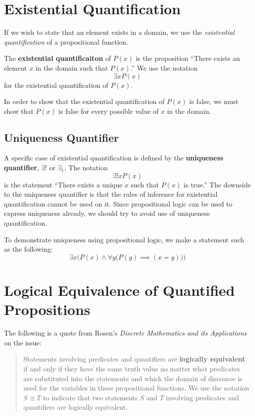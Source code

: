\section{Existential Quantification}

If we wish to state that an element exists in a domain, we use the \emph{existential quantification} of a propositional function.

The \textbf{existential quantificaiton} of $P(x)$ is the proposition
  ``There exists an element $x$ in the domain such that $P(x)$.''
We use the notation \[\exists x P(x)\] for the existential quantification of $P(x)$.

\begin{note}
  In order to show that the existential quantification of $P(x)$ is false, we must
  show that $P(x)$ is false for every possible value of $x$ in the domain.
\end{note}


\subsection{Uniqueness Quantifier}
A specific case of existential quantification is defined by the
\textbf{uniqueness quantifier}, $\exists!$ or $\exists_1$. The notation
\[ \exists! x P(x) \]
is the statement ``There exists a unique $x$ such that $P(x)$ is true.'' The
downside to the uniqueness quantifier is that the rules of inference for
existential quantification cannot be used on it. Since propositional logic can
be used to express uniqueness already, we should try to avoid use of uniqueness
quantification.

To demonstrate uniqueness using propositional logic, we make a statement such as the following:
\[ \exists x \Big( P(x) \land \forall y \big( P(y) \implies (x=y)\big)\Big) \]

\section{Logical Equivalence of Quantified Propositions}

The following is a quote from Rosen's \emph{Discrete Mathematics and its Applications} on the issue:

\begin{quote}
  Statements involving predicates and quantifiers are \textbf{logically
  equivalent} if and only if they have the same truth value no matter what
  predicates are substituted into the statements and which the domain of
  discourse is used for the variables in these propositional functions. We use the
  notation $S \equiv T$ to indicate that two statements $S$ and $T$ involving
  predicates and quantifiers are logically equivalent.

  \hfill\cite[p.~45]{rosen}
\end{quote}

